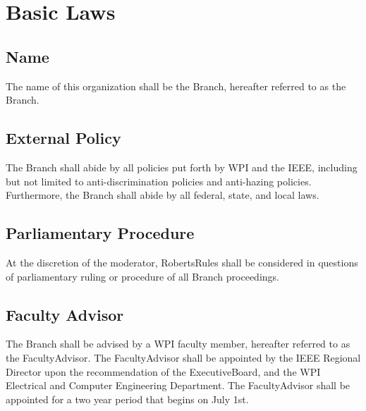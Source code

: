 \chapter{Basic Laws}\label{Bylaw:BasicLaws}

\section{Name}\label{Bylaw:BasicLaws:Name}
    The name of this organization shall be the \glsdesc{Branch}, hereafter referred to as the \gls{Branch}. 

\section{External Policy}\label{Bylaw:BasicLaws:ExternalPolicy}
    The \gls{Branch} shall abide by all policies put forth by \gls{WPI} and the \gls{IEEE}, including but not limited to anti-discrimination policies and anti-hazing policies. Furthermore, the \gls{Branch} shall abide by all federal, state, and local laws. 

\section{Parliamentary Procedure}\label{Bylaw:BasicLaws:ParliamentaryProcedure}
    At the discretion of the moderator, \Gls{RobertsRules} shall be considered in questions of parliamentary ruling or procedure of all \gls{Branch} proceedings.

\section{Faculty Advisor}\label{Bylaw:BasicLaws:FacultyAdvisor}
    The \gls{Branch} shall be advised by a \gls{WPI} faculty member, hereafter referred to as the \gls{FacultyAdvisor}. The \gls{FacultyAdvisor} shall be appointed by the \gls{IEEE} Regional Director upon the recommendation of the \gls{ExecutiveBoard}, and the \gls{WPI} Electrical and Computer Engineering Department. The \gls{FacultyAdvisor} shall be appointed for a two year period that begins on July 1st.
